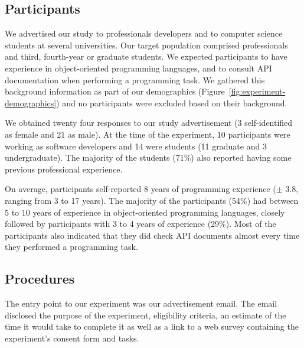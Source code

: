 \subsection{Participants}
\label{cp6:participants}


We advertised our study to professionals developers and to computer science students at  several universities. 
Our target population comprised professionals and third, fourth-year or graduate students.
We expected participants to have experience in object-oriented programming languages, and to consult API documentation when performing a programming task.
We gathered this background information as part of our demographics (Figure~\ref{fig:experiment-demographics})
and no participants were excluded
based on their background.






We obtained twenty four responses to our study advertisement (3 self-identified as female and 21 as male). 
At the time of the experiment, 10 participants were working as software
developers and 14 were students (11 graduate and 3 undergraduate).
The majority of the students (71\%) also reported having some previous professional experience.


On average, participants self-reported 8 years of programming experience ({\small $\pm$} 3.8, ranging from 3 to 17 years).
The majority of the participants (54\%) had between 5 to 10 years of experience in object-oriented programming languages,
closely followed by participants  with  3 to 4 years of experience (29\%). 
Most of the participants also indicated that they did check API documents almost every time they performed a programming task. 








\subsection{Procedures}
\label{cp6:procedures}




The entry point to our experiment was our advertisement email.
The email disclosed the purpose of the experiment, eligibility criteria, an estimate of the time it would take to complete it as well as a link 
to a web survey containing the experiment's consent form and tasks. 


